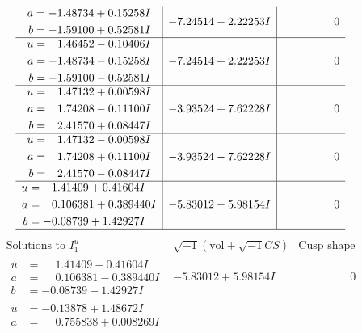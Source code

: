 \documentclass[1p]{elsarticle_modified}
\theoremstyle{definition}
\newcommand{\I}{\sqrt{-1}}
\begin{document}
$$\begin{array}{c|c|c}
\begin{aligned}
a &= -1.48734 + 0.15258 I \\
b &= -1.59100 + 0.52581 I\end{aligned}
 & -7.24514 - 2.22253 I & \phantom{-0.000000 } 0 \\ \hline\begin{aligned}
u &= \phantom{-}1.46452 - 0.10406 I \\
a &= -1.48734 - 0.15258 I \\
b &= -1.59100 - 0.52581 I\end{aligned}
 & -7.24514 + 2.22253 I & \phantom{-0.000000 } 0 \\ \hline\begin{aligned}
u &= \phantom{-}1.47132 + 0.00598 I \\
a &= \phantom{-}1.74208 - 0.11100 I \\
b &= \phantom{-}2.41570 + 0.08447 I\end{aligned}
 & -3.93524 + 7.62228 I & \phantom{-0.000000 } 0 \\ \hline\begin{aligned}
u &= \phantom{-}1.47132 - 0.00598 I \\
a &= \phantom{-}1.74208 + 0.11100 I \\
b &= \phantom{-}2.41570 - 0.08447 I\end{aligned}
 & -3.93524 - 7.62228 I & \phantom{-0.000000 } 0 \\ \hline\begin{aligned}
u &= \phantom{-}1.41409 + 0.41604 I \\
a &= \phantom{-}0.106381 + 0.389440 I \\
b &= -0.08739 + 1.42927 I\end{aligned}
 & -5.83012 - 5.98154 I & \phantom{-0.000000 } 0\\
 \hline 
 \end{array}$$\newpage$$\begin{array}{c|c|c}  
\text{Solutions to }I^u_{1}& \I (\text{vol} + \sqrt{-1}CS) & \text{Cusp shape}\\
 \hline 
\begin{aligned}
u &= \phantom{-}1.41409 - 0.41604 I \\
a &= \phantom{-}0.106381 - 0.389440 I \\
b &= -0.08739 - 1.42927 I\end{aligned}
 & -5.83012 + 5.98154 I & \phantom{-0.000000 } 0 \\ \hline\begin{aligned}
u &= -0.13878 + 1.48672 I \\
a &= \phantom{-}0.755838 + 0.008269 I \\

\end{aligned}
\end{array}$$
\end{document}
